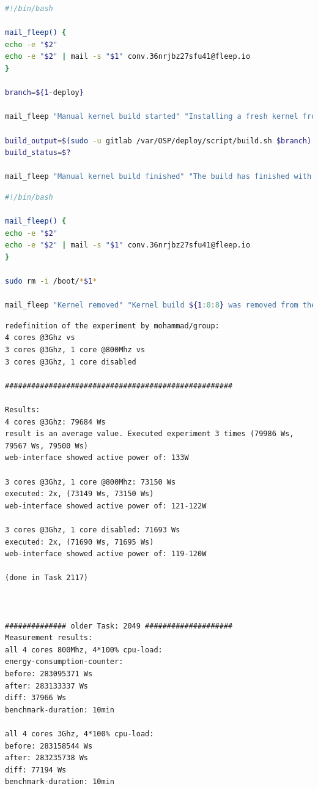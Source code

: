 \documentclass[]{report}
\begin{document}
\begin{lstlisting}[language=bash, style=code, caption=/usr/bin/build-kernel]
#!/bin/bash

mail_fleep() {
echo -e "$2"
echo -e "$2" | mail -s "$1" conv.36nrjbz27sfu41@fleep.io
}

branch=${1-deploy}

mail_fleep "Manual kernel build started" "Installing a fresh kernel from '$branch' branch"

build_output=$(sudo -u gitlab /var/OSP/deploy/script/build.sh $branch)
build_status=$?

mail_fleep "Manual kernel build finished" "The build has finished with status '$build_status':\n$build_output"
\end{lstlisting}

\begin{lstlisting}[language=bash, style=code, caption=/usr/bin/rm-kernel]
#!/bin/bash

mail_fleep() {
echo -e "$2"
echo -e "$2" | mail -s "$1" conv.36nrjbz27sfu41@fleep.io
}

sudo rm -i /boot/*$1*

mail_fleep "Kernel removed" "Kernel build ${1:0:8} was removed from the server"
\end{lstlisting}

\begin{lstlisting}[style=simple, caption=energy-experiments.txt]
redefinition of the experiment by mohammad/group:
4 cores @3Ghz vs
3 cores @3Ghz, 1 core @800Mhz vs
3 cores @3Ghz, 1 core disabled

####################################################

Results:
4 cores @3Ghz: 79684 Ws
result is an average value. Executed experiment 3 times (79986 Ws, 79567 Ws, 79500 Ws)
web-interface showed active power of: 133W

3 cores @3Ghz, 1 core @800Mhz: 73150 Ws 
executed: 2x, (73149 Ws, 73150 Ws)
web-interface showed active power of: 121-122W

3 cores @3Ghz, 1 core disabled: 71693 Ws
executed: 2x, (71690 Ws, 71695 Ws)
web-interface showed active power of: 119-120W

(done in Task 2117)



############## older Task: 2049 ####################
Measurement results:
all 4 cores 800Mhz, 4*100% cpu-load:
energy-consumption-counter:
before: 283095371 Ws
after: 283133337 Ws
diff: 37966 Ws
benchmark-duration: 10min

all 4 cores 3Ghz, 4*100% cpu-load:
before: 283158544 Ws
after: 283235738 Ws
diff: 77194 Ws
benchmark-duration: 10min
\end{lstlisting}

\label{nergy}
\end{document}
